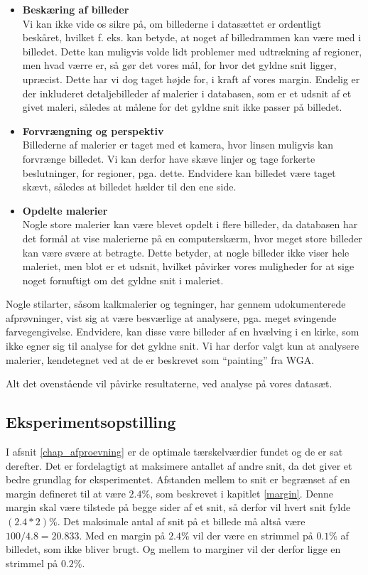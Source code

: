 {\begin{itemize}
    \item \textbf{Beskæring af billeder}\\
        Vi kan ikke vide os sikre på, om billederne i datasættet er
        ordentligt beskåret, hvilket f. eks. kan betyde, at noget af
        billedrammen kan være med i billedet. Dette kan muligvis volde
        lidt problemer med udtrækning af regioner, men hvad værre er, så
        gør det vores mål, for hvor det gyldne snit ligger, upræcist.
        Dette har vi dog taget højde for, i kraft af vores margin.
        Endelig er der inkluderet detaljebilleder af malerier i
        databasen, som er et udsnit af et givet maleri, således at
        målene for det gyldne snit ikke passer på billedet.
    \item \textbf{Forvrængning og perspektiv}\\
        Billederne af malerier er taget med et kamera, hvor linsen muligvis kan
        forvrænge billedet. Vi kan derfor have skæve linjer og tage
        forkerte beslutninger, for regioner, pga. dette. Endvidere kan
        billedet være taget skævt, således at billedet hælder til den
        ene side.
    \item \textbf{Opdelte malerier}\\
        Nogle store malerier kan være blevet opdelt i flere billeder, da
        databasen har det formål at vise malerierne på en computerskærm,
        hvor meget store billeder kan være svære at betragte. Dette
        betyder, at nogle billeder ikke viser hele maleriet, men blot er
        et udsnit, hvilket påvirker vores muligheder for at sige noget
        fornuftigt om det gyldne snit i maleriet.
\end{itemize}

Nogle stilarter, såsom kalkmalerier og tegninger, har gennem
udokumenterede afprøvninger, vist sig at være besværlige at analysere,
pga. meget svingende farvegengivelse. Endvidere, kan disse være billeder
af en hvælving i en kirke, som ikke egner sig til analyse for det gyldne
snit. Vi har derfor valgt kun at analysere malerier, kendetegnet ved at
de er beskrevet som ``painting'' fra WGA.

Alt det ovenstående vil påvirke resultaterne, ved analyse på vores
datasæt.

\subsection{Eksperimentsopstilling}
I afsnit \ref{chap_afproevning} er de optimale tærskelværdier fundet og
de er sat derefter.
Det er fordelagtigt at maksimere antallet af andre snit, da det giver et bedre grundlag for eksperimentet.  Afstanden
mellem to snit er begrænset af en margin defineret til at være
$2.4\%$, som beskrevet i kapitlet \ref{margin}.  Denne margin skal være tilstede på begge sider af
et snit, så derfor vil hvert snit fylde $(2.4*2)\%$.  Det maksimale
antal af snit på et billede må altså være $100/4.8=20.833$.
Med en margin på $2.4\%$ vil der være en strimmel på $0.1\%$ af
billedet, som ikke bliver brugt. Og mellem to marginer vil der derfor ligge en
strimmel på $0.2\%$. 

}
